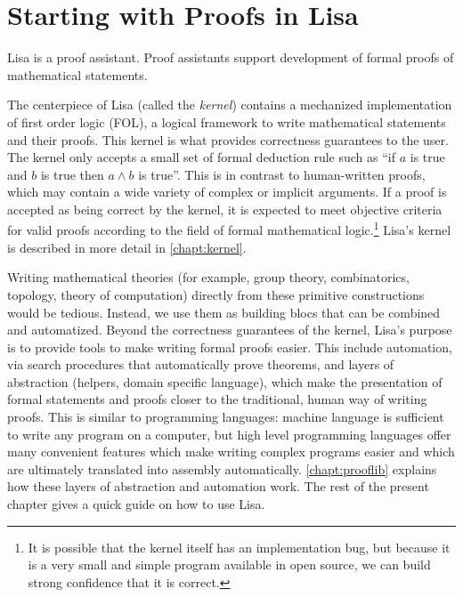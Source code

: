 \chapter{Starting with Proofs in Lisa}
\label{chapt:quickguide}
Lisa is a proof assistant. Proof assistants support development of formal proofs of mathematical statements. 

The centerpiece of Lisa (called the \emph{kernel}) contains a mechanized implementation of first order logic (FOL), a logical framework to write mathematical statements and their proofs. This kernel is what provides correctness guarantees to the user. The kernel only accepts a small set of formal deduction rule such as ``if $a$ is true and $b$ is true then $a\land b$ is true''.
This is in contrast to human-written proofs, which may contain a wide variety of complex or implicit arguments. If a proof is accepted as being correct by the kernel, it is expected to meet objective criteria for valid proofs according to the field of formal mathematical logic.\footnote{It is possible that the kernel itself has an implementation bug, but because it is a very small and simple program available in open source, we can build strong confidence that it is correct.}
Lisa's kernel is described in more detail in \autoref{chapt:kernel}.

Writing mathematical theories (for example, group theory, combinatorics, topology, theory of computation) directly from these primitive constructions would be tedious. Instead, we use them as building blocs that can be combined and automatized. Beyond the correctness guarantees of the kernel, Lisa's purpose is to provide tools to make writing formal proofs easier. This include automation, via search procedures that automatically prove theorems, and layers of abstraction (helpers, domain specific language), which make the presentation of formal statements and proofs closer to the traditional, human way of writing proofs. 
This is similar to programming languages: machine language is sufficient to write any program on a computer, but high level programming languages offer many convenient features which make writing complex programs easier and which are ultimately translated into assembly automatically. 
\autoref{chapt:prooflib} explains how these layers of abstraction and automation work. The rest of the present chapter gives a quick guide on how to use Lisa.

